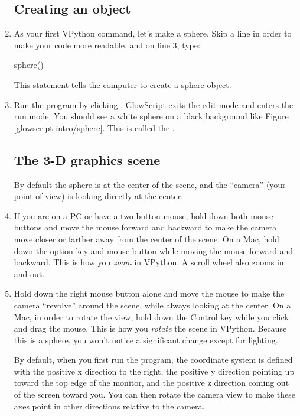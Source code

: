 \begin{enumerate}
	\subsection*{Creating an object}

	\item As your first VPython command, let's make a sphere. Skip a line in order to make your code more readable, and on line 3, type:

\begin{myvpython}
sphere()
\end{myvpython}

This statement tells the computer to create a sphere object.

	\item Run the program by clicking . GlowScript exits the edit mode and enters the run mode. You should see a white sphere on a black background like Figure \ref{glowscript-intro/sphere}. This is called the .



	\subsection*{The 3-D graphics scene}
	
By default the sphere is at the center of the scene, and the ``camera'' (your point of view) is looking directly at the center.
	
	\item If you are on a PC or have a two-button mouse, hold down both mouse buttons and move the mouse forward and backward to make the camera move closer or farther away from the center of the scene. On a Mac, hold down the option key and mouse button while moving the mouse forward and backward. This is how you \emph{zoom} in VPython. A scroll wheel also zooms in and out.
	
	\item Hold down the right mouse button alone and move the mouse to make the camera ``revolve'' around the scene, while always looking at the center. On a Mac, in order to rotate the view, hold down the Control key while you click and drag the mouse. This is how you \emph{rotate} the scene in VPython. Because this is a sphere, you won't notice a significant change except for lighting.

By default, when you first run the program, the coordinate system is defined with the positive x direction to the right, the positive y direction pointing up toward the top edge of the monitor, and the positive z direction coming out of the screen toward you. You can then rotate the camera view to make these axes point in other directions relative to the camera. 
		

\end{enumerate}
